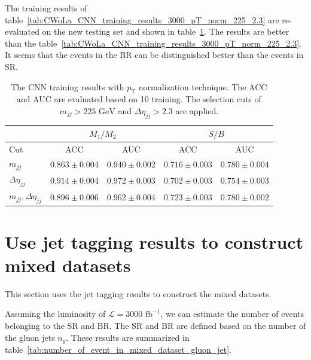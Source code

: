 \documentclass[12pt]{article}
\begin{document}
        The training results of table~\ref{tab:CWoLa_CNN_training_results_3000_pT_norm_225_2.3} are re-evaluated on the new testing set and shown in table~\ref{tab:CWoLa_CNN_training_results_3000_pT_norm_225_2.3_new_test_set}. The results are better than the table~\ref{tab:CWoLa_CNN_training_results_3000_pT_norm_225_2.3}. It seems that the events in the BR can be distinguished better than the events in SR.
    \begin{table}[htpb]
        \centering
        \caption{The CNN training results with $p_{\text{T}}$ normalization technique. The ACC and AUC are evaluated based on 10 training. The selection cuts of $m_{jj} > \text{225 GeV}$ and $\Delta\eta_{jj} > 2.3$ are applied.}
        \label{tab:CWoLa_CNN_training_results_3000_pT_norm_225_2.3_new_test_set}
        \begin{tabular}{l|cc|cc}
                                      & \multicolumn{2}{c|}{$M_1 / M_2$}      & \multicolumn{2}{c}{$S / B$}           \\ \hline
            Cut                       & ACC               & AUC               & ACC               & AUC               \\ \hline
            $m_{jj}$                  & $0.863 \pm 0.004$ & $0.940 \pm 0.002$ & $0.716 \pm 0.003$ & $0.780 \pm 0.004$ \\
            $\Delta\eta_{jj}$         & $0.914 \pm 0.004$ & $0.972 \pm 0.003$ & $0.702 \pm 0.003$ & $0.754 \pm 0.003$ \\
            $m_{jj}, \Delta\eta_{jj}$ & $0.896 \pm 0.006$ & $0.962 \pm 0.004$ & $0.723 \pm 0.003$ & $0.780 \pm 0.002$
        \end{tabular}
    \end{table}
\section{Use jet tagging results to construct mixed datasets}%
\label{sec:use_jet_tagging_results_to_construct_mixed_datasets}
    This section uses the jet tagging results to construct the mixed datasets.

    Assuming the luminosity of $\mathcal{L} = \text{3000 fb}^{-1}$, we can estimate the number of events belonging to the SR and BR. The SR and BR are defined based on the number of the gluon jets $n_g$. These results are summarized in table~\ref{tab:number_of_event_in_mixed_dataset_gluon_jet}.
\end{document}

